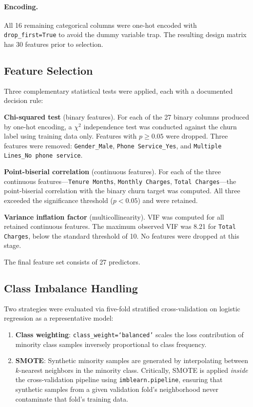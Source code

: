 \documentclass{article}
\begin{document}
\paragraph{Encoding.}
All 16 remaining categorical columns were one-hot encoded with \texttt{drop\_first=True}
to avoid the dummy variable trap. The resulting design matrix has 30 features prior
to selection.

\subsection{Feature Selection}

Three complementary statistical tests were applied, each with a documented decision rule:

\textbf{Chi-squared test} (binary features). For each of the 27 binary columns produced
by one-hot encoding, a $\chi^2$ independence test was conducted against the churn label
using training data only. Features with $p \geq 0.05$ were dropped. Three features were
removed: \texttt{Gender\_Male}, \texttt{Phone Service\_Yes}, and
\texttt{Multiple Lines\_No phone service}.

\textbf{Point-biserial correlation} (continuous features). For each of the three
continuous features---\texttt{Tenure Months}, \texttt{Monthly Charges},
\texttt{Total Charges}---the point-biserial correlation with the binary churn target
was computed. All three exceeded the significance threshold ($p < 0.05$) and were retained.

\textbf{Variance inflation factor} (multicollinearity). VIF was computed for all retained
continuous features. The maximum observed VIF was 8.21 for \texttt{Total Charges},
below the standard threshold of 10. No features were dropped at this stage.

The final feature set consists of 27 predictors.

\subsection{Class Imbalance Handling}

Two strategies were evaluated via five-fold stratified cross-validation on logistic
regression as a representative model:

\begin{enumerate}
  \item \textbf{Class weighting}: \texttt{class\_weight=`balanced'} scales the loss
        contribution of minority class samples inversely proportional to class frequency.
  \item \textbf{SMOTE}: Synthetic minority samples are generated by interpolating
        between $k$-nearest neighbors in the minority class. Critically, SMOTE is
        applied \emph{inside} the cross-validation pipeline using \texttt{imblearn.pipeline},
        ensuring that synthetic samples from a given validation fold's neighborhood
        never contaminate that fold's training data.
\end{enumerate}
\end{document}
